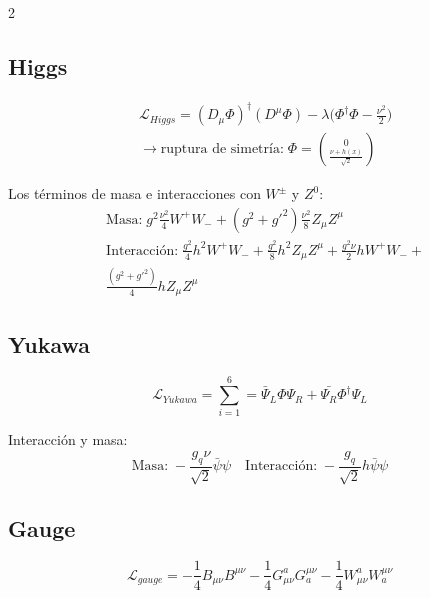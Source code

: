 \documentclass[12pt]{article}
\begin{document}
\begin{multicols}{2}
        \subsection*{Higgs}
        \begin{equation*}
            \begin{aligned}
                &\mathcal{L}_{Higgs} = (D_{\mu} \Phi)^{\dagger} (D^{\mu} \Phi) - \lambda \bigg(\Phi^{\dagger} \Phi - \frac{\nu^2}{2} \bigg) \\ 
                &\rightarrow \text{ruptura de simetría:}\; \Phi = \binom{0}{\frac{\nu + h(x)}{\sqrt{2}}}  
            \end{aligned}
        \end{equation*}

        Los términos de masa e interacciones con $W^{\pm}$ y $Z^{0}$:
        \begin{equation*}
            \begin{aligned}
                &\text{Masa:} \; g^2 \frac{\nu^{2}}{4}W^{+}W_{-} + (g^2 + g'^{2})\frac{\nu^{2}}{8}Z_{\mu}Z^{\mu} \\
                &\text{Interacción:} \; \frac{g^2}{4}h^2W^{+}W_{-} + \frac{g^2}{8}h^2Z_{\mu}Z^{\mu} + \frac{g^2\nu}{2}hW^{+}W_{-} + \\
                &\frac{(g^2 +g'^{2})}{4}hZ_{\mu}Z^{\mu}
            \end{aligned}
        \end{equation*}

        \subsection*{Yukawa}
        \begin{equation*}
            \mathcal{L}_{Yukawa} = \sum_{i=1}^{6} = \bar{\Psi}_{L} \Phi \Psi_{R} + \bar{\Psi_{R}} \Phi^{\dagger} \Psi_{L}
        \end{equation*}

        Interacción y masa:
        \begin{equation*}
            \text{Masa:} \; -\frac{g_q \nu}{\sqrt{2}}\bar{\psi}\psi \quad
            \text{Interacción:} \; -\frac{g_q}{\sqrt{2}}h\bar{\psi}\psi
        \end{equation*}

        \subsection*{Gauge}
        \begin{equation*}
            \mathcal{L}_{gauge} = - \frac14 B_{\mu\nu}B^{\mu\nu} - \frac14 G^a_{\mu\nu}G^{\mu\nu}_a - \frac14 W^a_{\mu\nu}W^{\mu\nu}_a
        \end{equation*}


\end{multicols}
\end{document}

